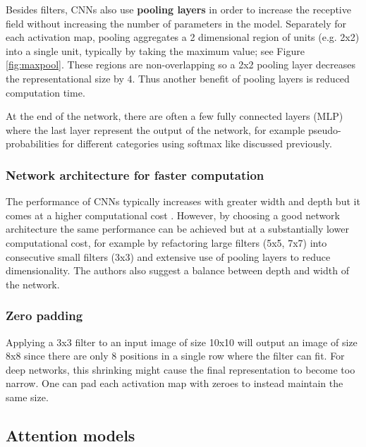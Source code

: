 


Besides filters, CNNs also use \textbf{pooling layers} in order to increase the receptive field without increasing the number of parameters in the model.
Separately for each activation map, pooling aggregates a 2 dimensional region of units (e.g. 2x2) into a single unit, typically by taking the maximum value; see Figure \ref{fig:maxpool}. These regions are non-overlapping so a 2x2 pooling layer decreases the representational size by 4. Thus another benefit of pooling layers is reduced computation time.

At the end of the network, there are often a few fully connected layers (MLP) where the last layer represent the output of the network, for example pseudo-probabilities for different categories using softmax like discussed previously.

\subsubsection{Network architecture for faster computation}

The performance of CNNs typically increases with greater width and depth but it comes at a higher computational cost \cite{InceptionV3}. However, by choosing a good network architecture the same performance can be achieved but at a substantially lower computational cost, for example by refactoring large filters (5x5, 7x7) into consecutive small filters (3x3) and extensive use of pooling layers to reduce dimensionality. The authors also suggest a balance between depth and width of the network.

\subsubsection{Zero padding}

Applying a 3x3 filter to an input image of size 10x10 will output an image of size 8x8 since there are only 8 positions in a single row where the filter can fit. For deep networks, this shrinking might cause the final representation to become too narrow.
One can pad each activation map with zeroes to instead maintain the same size.

\subsection{Attention models}
\label{ssec:attention}

